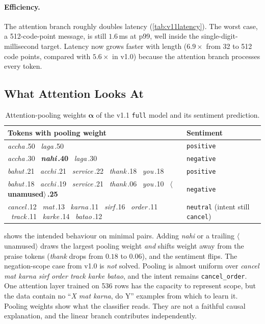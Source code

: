 \documentclass[11pt,a4paper]{article}
\theoremstyle{remark}
\newcommand{\lbl}[1]{\texttt{#1}}                      %
\newcommand{\hi}[1]{\textit{#1}}                       %
\newcommand{\emo}[1]{\textsf{\small$\langle$#1$\rangle$}} %
\begin{document}
\paragraph{Efficiency.} The attention branch roughly doubles latency
(\cref{tab:v11latency}). The worst case, a 512-code-point message, is still
$1.6$\,ms at p99, well inside the single-digit-millisecond target. Latency
now grows faster with length ($6.9\times$ from 32 to 512 code points, compared
with $5.6\times$ in v1.0) because the attention branch processes every token.

\subsection{What Attention Looks At}
\label{sec:v11qual}

\begin{table}[h]
\centering\small
\caption{Attention-pooling weights $\bm\alpha$ of the v1.1 \lbl{full} model and its sentiment prediction.}
\label{tab:v11alpha}
\begin{tabularx}{\linewidth}{@{}X l@{}}
\toprule
Tokens with pooling weight & Sentiment \\
\midrule
\hi{accha}\,.50 \ \hi{laga}\,.50 & \lbl{positive} \\
\hi{accha}\,.30 \ \textbf{\hi{nahi}\,.40} \ \hi{laga}\,.30 & \lbl{negative} \\
\hi{bahut}\,.21 \ \hi{acchi}\,.21 \ \hi{service}\,.22 \ \hi{thank}\,.18 \ \hi{you}\,.18 & \lbl{positive} \\
\hi{bahut}\,.18 \ \hi{acchi}\,.19 \ \hi{service}\,.21 \ \hi{thank}\,.06 \ \hi{you}\,.10 \ \textbf{\emo{unamused}\,.25} & \lbl{negative} \\
\hi{cancel}\,.12 \ \hi{mat}\,.13 \ \hi{karna}\,.11 \ \hi{sirf}\,.16 \ \hi{order}\,.11 \ \hi{track}\,.11 \ \hi{karke}\,.14 \ \hi{batao}\,.12 & \lbl{neutral} (intent still \lbl{cancel}) \\
\bottomrule
\end{tabularx}
\end{table}

 shows the intended behaviour on minimal pairs. Adding
\hi{nahi} or a trailing \emo{unamused} draws the largest pooling weight
\emph{and} shifts weight away from the praise tokens (\hi{thank} drops from
$0.18$ to $0.06$), and the sentiment flips. The negation-scope case from
v1.0 is \emph{not} solved. Pooling is almost uniform over
\hi{cancel mat karna sirf order track karke batao}, and the intent remains
\lbl{cancel\_order}. One attention layer trained on 536 rows has the capacity
to represent scope, but the data contain no ``\hi{X mat karna}, do Y''
examples from which to learn it. Pooling weights show what the classifier
reads. They are not a faithful causal explanation, and the linear branch
contributes independently.
\end{document}
